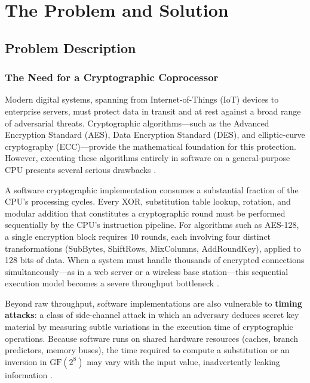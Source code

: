 \documentclass[12pt, a4paper]{report}
\begin{document}
\chapter{The Problem and Solution}

\section{Problem Description}

\subsection{The Need for a Cryptographic Coprocessor}

Modern digital systems, spanning from Internet-of-Things (IoT) devices to enterprise servers,
must protect data in transit and at rest against a broad range of adversarial threats.
Cryptographic algorithms—such as the Advanced Encryption Standard (AES), Data Encryption
Standard (DES), and elliptic-curve cryptography (ECC)—provide the mathematical foundation
for this protection. However, executing these algorithms entirely in software on a
general-purpose CPU presents several serious drawbacks \cite{tan2021hardware}.

A software cryptographic implementation consumes a substantial fraction of the CPU's
processing cycles. Every XOR, substitution table lookup, rotation, and modular addition
that constitutes a cryptographic round must be performed sequentially by the CPU's
instruction pipeline. For algorithms such as AES-128, a single encryption block requires
10 rounds, each involving four distinct transformations (SubBytes, ShiftRows, MixColumns,
AddRoundKey), applied to 128 bits of data. When a system must handle thousands of encrypted
connections simultaneously—as in a web server or a wireless base station—this sequential
execution model becomes a severe throughput bottleneck \cite{nassim2025fpga}.

Beyond raw throughput, software implementations are also vulnerable to \textbf{timing attacks}:
a class of side-channel attack in which an adversary deduces secret key material by
measuring subtle variations in the execution time of cryptographic operations. Because
software runs on shared hardware resources (caches, branch predictors, memory buses),
the time required to compute a substitution or an inversion in $\mathrm{GF}(2^8)$ may
vary with the input value, inadvertently leaking information \cite{nassim2025fpga}.
\end{document}
